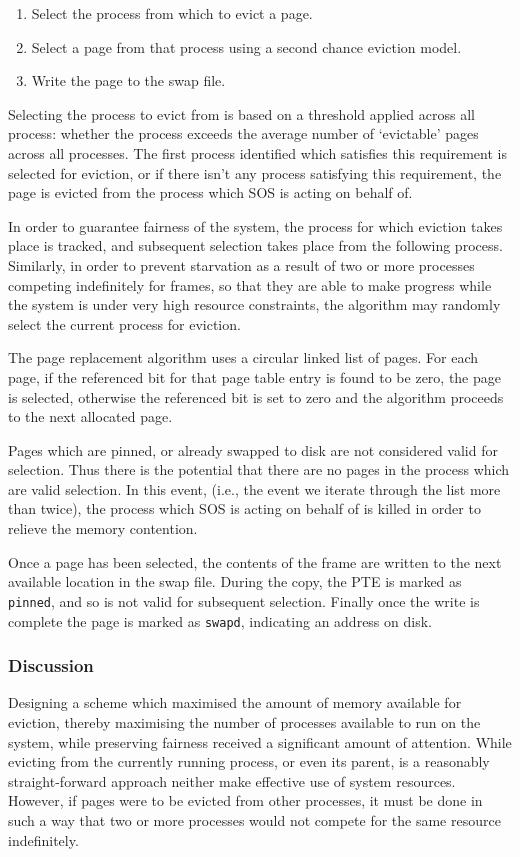 \documentclass[a4paper,12pt]{article}
\begin{document}
\begin{enumerate}
\item Select the process from which to evict a page.
\item Select a page from that process using a second chance eviction model.
\item Write the page to the swap file.
\end{enumerate}

Selecting the process to evict from is based on a threshold applied across all
process: whether the process exceeds the average number of `evictable' pages
across all processes.  The first process identified which satisfies this
requirement is selected for eviction, or if there isn't any process satisfying
this requirement, the page is evicted from the process which SOS is acting on
behalf of.

In order to guarantee fairness of the system, the process for which eviction
takes place is tracked, and subsequent selection takes place from the
following process.  Similarly, in order to prevent starvation as a result of
two or more processes competing indefinitely for frames, so that they are able
to make progress while the system is under very high resource constraints, the
algorithm may randomly select the current process for eviction.

The page replacement algorithm uses a circular linked list of pages.  For each
page, if the referenced bit for that page table entry is found to be zero, the
page is selected, otherwise the referenced bit is set to zero and the
algorithm proceeds to the next allocated page.

Pages which are pinned, or already swapped to disk are not considered valid
for selection.  Thus there is the potential that there are no pages in the
process which are valid selection.  In this event, (i.e., the event we iterate
through the list more than twice), the process which SOS is acting on behalf
of is killed in order to relieve the memory contention.

Once a page has been selected, the contents of the frame are written to the
next available location in the swap file.  During the copy, the PTE is marked
as \texttt{pinned}, and so is not valid for subsequent selection.  Finally
once the write is complete the page is marked as \texttt{swapd}, indicating an
address on disk.

\subsubsection{Discussion}
Designing a scheme which maximised the amount of memory available for
eviction, thereby maximising the number of processes available to run on the
system, while preserving fairness received a significant amount of attention.
While evicting from the currently running process, or even its parent, is a
reasonably straight-forward approach neither make effective use of system
resources.  However, if pages were to be evicted from other processes, it must
be done in such a way that two or more processes would not compete for the
same resource indefinitely.
\end{document}
